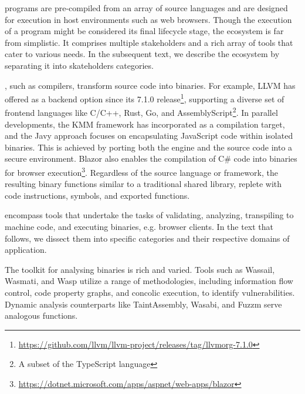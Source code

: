 \Wasm programs are pre-compiled from an array of source languages and are designed for execution in host environments such as web browsers.
Though the execution of a \Wasm program might be considered its final lifecycle stage, the \Wasm ecosystem is far from simplistic.
It comprises multiple stakeholders and a rich array of tools that cater to various needs.
In the subsequent text, we describe the \Wasm ecosystem by separating it into skateholders categories.

, such as compilers, transform source code into \Wasm binaries. 
For example, LLVM has offered \Wasm as a backend option since its 7.1.0 release\footnote{\url{https://github.com/llvm/llvm-project/releases/tag/llvmorg-7.1.0}}, supporting a diverse set of frontend languages like C/C++, Rust, Go, and AssemblyScript\footnote{A subset of the TypeScript language}.
In parallel developments, the KMM framework\cite{kmm} has incorporated \Wasm as a compilation target, and the Javy approach\cite{Javy} focuses on encapsulating JavaScript code within isolated \Wasm binaries. 
This is achieved by porting both the engine and the source code into a secure \Wasm environment. 
Blazor also enables the compilation of C# code into \Wasm binaries for browser execution\footnote{\url{https://dotnet.microsoft.com/apps/aspnet/web-apps/blazor}}.
Regardless of the source language or framework, the resulting \Wasm binary functions similar to a traditional shared library, replete with code instructions, symbols, and exported functions.

 encompass tools that undertake the tasks of validating, analyzing, transpiling to machine code, and executing \Wasm binaries, e.g. browser clients. 
In the text that follows, we dissect them into specific categories and their respective domains of application.

 \cite{WasmA}

 The toolkit for analysing \Wasm binaries is rich and varied. 
Tools such as Wassail\cite{wassail}, Wasmati\cite{wasmati}, and Wasp\cite{Wasp} utilize a range of methodologies, including information flow control, code property graphs, and concolic execution, to identify vulnerabilities. 
Dynamic analysis counterparts like TaintAssembly\cite{taintassembly}, Wasabi\cite{wasabi}, and Fuzzm\cite{fuzzm} serve analogous functions.

